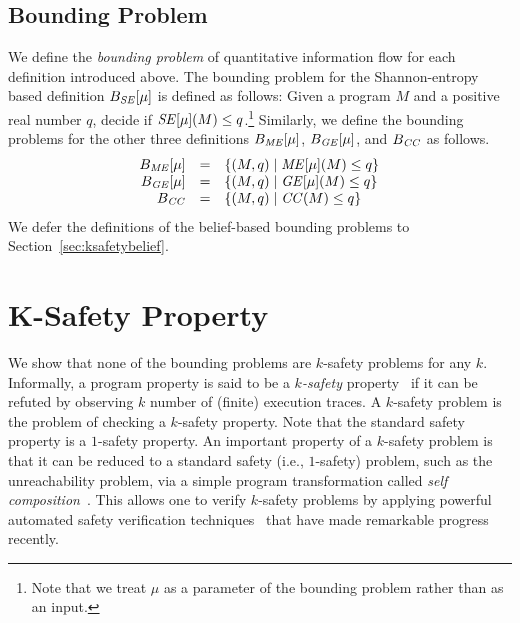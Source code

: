 \documentclass{llncs}
\newcommand{\aset}[1]{\{{#1}\}}
\begin{document}
\subsection{Bounding Problem}

\label{sec:boundprob}

We define the {\em bounding problem} of quantitative information flow
for each definition introduced above.  The bounding problem for the
Shannon-entropy based definition $B_{\it SE}[\mu]$ is defined as
follows: Given a program $M$ and a positive real number $q$, decide if
${\it SE}[\mu](M) \leq q$.\footnote{Note that we treat $\mu$ as a
    parameter of the bounding problem rather than as an input.}
Similarly, we define the bounding problems for the other three
definitions $B_{\it ME}[\mu]$, $B_{\it GE}[\mu]$, and $B_{\it CC}$ as
follows.
\[
\begin{array}{rcl}
B_{\it ME}[\mu]&=&\aset{(M,q)\mid {\it ME}[\mu](M)\le q}\\
B_{\it GE}[\mu]&=&\aset{(M,q)\mid {\it GE}[\mu](M)\le q}\\ 
B_{\it CC}&=&\aset{(M,q)\mid {\it CC}(M)\le q}
\end{array}
\]
We defer the definitions of the belief-based bounding problems to 
Section~\ref{sec:ksafetybelief}.
\section{K-Safety Property}

\label{sec:ksafety}

We show that none of the bounding problems are $k$-safety problems for
any $k$.  Informally, a program property is said to be a {\em
  $k$-safety}
property~\cite{terauchi:sas05,DBLP:conf/csfw/ClarksonS08} if it can be
refuted by observing $k$ number of (finite) execution traces.  A
$k$-safety problem is the problem of checking a $k$-safety property.
Note that the standard safety property is a $1$-safety property.  An
important property of a $k$-safety problem is that it can be reduced
to a standard safety (i.e., $1$-safety) problem, such as the
unreachability problem, via a simple program transformation called
{\em self composition}~\cite{barthe:csfw04,darvas:spc05}.  This allows
one to verify $k$-safety problems by applying powerful automated
safety verification
techniques~\cite{DBLP:conf/popl/BallR02,DBLP:conf/popl/HenzingerJMS02,mcmillan:cav06,DBLP:journals/sttt/BeyerHJM07}
that have made remarkable progress recently.
\end{document}
